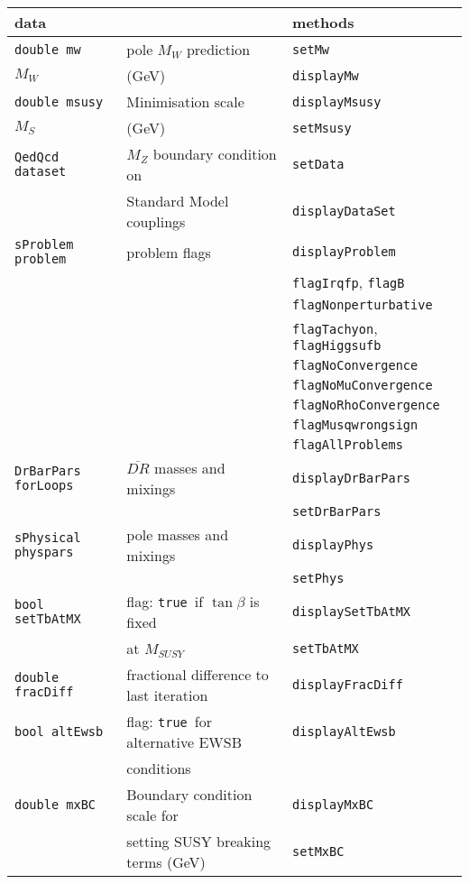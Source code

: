 \documentclass{article}
\def\code#1{\small{\tt #1}\normalsize}
\begin{document}
\begin{table}\begin{center}\begin{tabular}{lll}      
data & & methods \\ \hline
\code{double mw} & pole $M_W$ prediction & \code{setMw} \\
$M_W$ & (GeV) & \code{displayMw} \\ \hline
\code{double msusy} & Minimisation scale & \code{displayMsusy} \\
$M_{S}$ & (GeV) & \code{setMsusy} \\ \hline
\code{QedQcd dataset} & $M_Z$ boundary condition on  &
\code{setData} \\
 & Standard Model couplings & \code{displayDataSet} \\ \hline
\code{sProblem problem} & problem flags & \code{displayProblem} \\
&& \code{flagIrqfp}, \code{flagB} \\
&& \code{flagNonperturbative} \\
&& \code{flagTachyon}, \code{flagHiggsufb} \\
&& \code{flagNoConvergence} \\
&& \code{flagNoMuConvergence} \\
&& \code{flagNoRhoConvergence} \\
&& \code{flagMusqwrongsign} \\
&& \code{flagAllProblems} \\ \hline
\code{DrBarPars forLoops} & $\overline{DR}$ masses and mixings& \code{displayDrBarPars} \\
 &  & \code{setDrBarPars} \\ \hline
\code{sPhysical physpars} & pole masses and mixings & \code{displayPhys}\\
 && \code{setPhys}\\ \hline
\code{bool setTbAtMX} & flag: \code{true}~if $\tan \beta$ is fixed  & \code{displaySetTbAtMX} \\
 &at
$M_{SUSY}$ & \code{setTbAtMX} \\ \hline
\code{double fracDiff} & fractional difference to last iteration &
\code{displayFracDiff} \\ \hline
\code{bool altEwsb} & flag: \code{true}~for alternative EWSB &
\code{displayAltEwsb} \\ 
& conditions & \\ \hline
\code{double mxBC} & Boundary condition scale for & \code{displayMxBC} \\
 & setting SUSY breaking terms (GeV) & \code{setMxBC} \\ \hline

\end{tabular}
\end{center}
\end{table}
\end{document}
